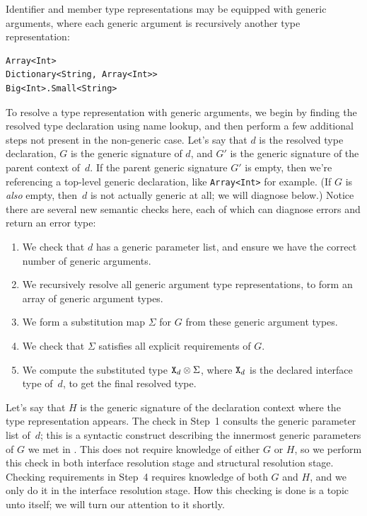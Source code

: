\documentclass[../generics]{subfiles}
\begin{document}
Identifier and member type representations may be equipped with generic arguments, where each generic argument is recursively another type representation:
\begin{Verbatim}
Array<Int>
Dictionary<String, Array<Int>>
Big<Int>.Small<String>
\end{Verbatim}
To resolve a type representation with generic arguments, we begin by finding the resolved type declaration using name lookup, and then perform a few additional steps not present in the non-generic case. Let's say that $d$ is the resolved type declaration, $G$ is the generic signature of $d$, and $G'$ is the generic signature of the parent context of~$d$. If the parent generic signature $G'$ is empty, then we're referencing a top-level generic declaration, like \texttt{Array<Int>} for example. (If $G$ is \emph{also} empty, then~$d$ is not actually generic at all; we will diagnose below.) Notice there are several new semantic checks here, each of which can diagnose errors and return an error type:
\begin{enumerate}
\item We check that $d$ has a generic parameter list, and ensure we have the correct number of generic arguments.
\item We recursively resolve all generic argument type representations, to form an array of generic argument types.
\item We form a substitution map $\Sigma$ for $G$ from these generic argument types.
\item We check that $\Sigma$ satisfies all explicit requirements of $G$.
\item We compute the substituted type $\texttt{X}_d\otimes\Sigma$, where $\texttt{X}_d$ is the declared interface type of~$d$, to get the final resolved type.
\end{enumerate}

Let's say that $H$ is the generic signature of the declaration context where the type representation appears. The check in Step~1 consults the generic parameter list of~$d$; this is a syntactic construct describing the innermost generic parameters of $G$ we met in . This does not require knowledge of either $G$ or $H$, so we perform this check in both interface resolution stage and structural resolution stage. Checking requirements in Step~4 requires knowledge of both $G$ and $H$, and we only do it in the interface resolution stage. How this checking is done is a topic unto itself; we will turn our attention to it shortly.
\end{document}
